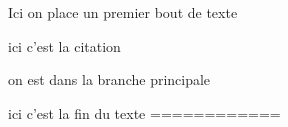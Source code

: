\documentclass{sn-jnl}%
\begin{document}
Ici on place un premier bout de texte

ici c'est la citation \cite{qu_vitro_2007}

on est dans la branche principale

ici c'est la fin du texte
============%

\end{document}
